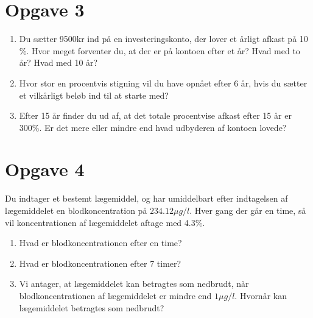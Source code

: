 \section*{Opgave 3}
\begin{enumerate}[label=\roman*)]
	\item Du sætter 9500kr ind på en investeringskonto, der lover et årligt afkast på 10$\%$. Hvor meget forventer du,
	 at der er på kontoen efter et år? Hvad med to år? Hvad med 10 år?
	\item Hvor stor en procentvis stigning vil du have opnået efter 6 år, hvis du sætter et vilkårligt beløb ind til at
	starte med?
	\item Efter 15 år finder du ud af, at det totale procentvise afkast efter 15 år er $300\%$. Er det mere eller mindre 
	end hvad udbyderen af kontoen lovede?
\end{enumerate}

\section*{Opgave 4}
Du indtager et bestemt lægemiddel, og har umiddelbart efter indtagelsen af lægemiddelet en blodkoncentration 
	på $234.12 \mu g / l$. Hver gang der går en time, så vil koncentrationen af lægemiddelet aftage med 4.3$\%$. 
\begin{enumerate}[label=\roman*)]
	\item Hvad er blodkoncentrationen efter en time? 
	\item Hvad er blodkoncentrationen efter 7 timer?
	\item Vi antager, at lægemiddelet kan betragtes som nedbrudt, når blodkoncentrationen af lægemiddelet er mindre end
	 $1\mu g/l$. Hvornår kan lægemiddelet betragtes som nedbrudt?
\end{enumerate}
